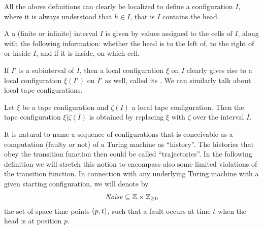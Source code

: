 \documentclass[11pt]{memoir}
\theoremstyle{definition} %
\renewcommand{\ge}{\geq}
\newcommand{\h}{h}
\newcommand{\Noise}{\mathit{Noise}}
\begin{document}
All the above definitions can clearly be localized to define a configuration
 \( I \), where it is always understood that \( \h\in I \), that is 
\( I \) contains the head.

\begin{definition}
\label{def:local-config}
  A  a (finite or infinite)
  interval \( I \) is given by values assigned to the cells
  of \( I \), along with the following information: whether
  the head is to the left of, to the right of or inside
  \( I \), and if it is inside, on which cell.

  If \( I' \) is a subinterval of \( I \), then a local configuration
  \( \xi \) on \( I \) clearly gives rise to a local configuration
  \( \xi(I') \) on \( I' \) as well, called its .
  We can similarly talk about local tape configurations.
  
  Let \( \xi \) be a tape configuration and \( \zeta(I) \) a local
  tape  configuration.
  Then the tape configuration \( \xi\vert\zeta(I) \) is obtained by
  replacing \( \xi \) with \( \zeta \) over the interval \( I \).
\end{definition}

It is natural to name a sequence of configurations that is conceivable as a computation
(faulty or not) of a Turing machine as ``history''.
The histories that obey the transition function then could be called ``trajectories''.
In the following definition we will 
stretch this notion to encompass also some limited violations of the
transition function.
In connection with any underlying Turing machine with a given starting configuration, we will
denote by
\begin{align}\label{eq:noise-first}
   \Noise\subseteq \bbZ\times \bbZ_{\ge 0}
\end{align}
the set of space-time points \( (p,t) \), such that
a fault occurs at time \( t \) when the head is at position \( p \).
\end{document}
